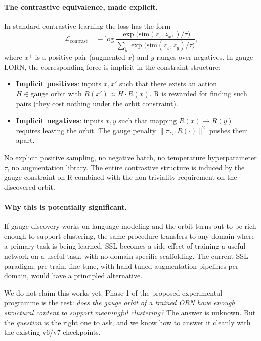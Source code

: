 \documentclass[11pt, a4paper]{article}
\theoremstyle{plain}
\theoremstyle{definition}
\theoremstyle{remark}
\begin{document}
\paragraph{The contrastive equivalence, made explicit.}
In standard contrastive learning the loss has the form
\[
\mathcal{L}_{\text{contrast}} = -\log \frac{\exp\!\big(\mathrm{sim}(z_x, z_{x^+})/\tau\big)}{\sum_{y} \exp\!\big(\mathrm{sim}(z_x, z_y)/\tau\big)},
\]
where $x^+$ is a positive pair (augmented $x$) and $y$ ranges over negatives.
In gauge-LORN, the corresponding force is implicit in the constraint structure:
\begin{itemize}[nosep]
\item \textbf{Implicit positives}: inputs $x, x'$ such that there exists an action $H \in \text{gauge orbit}$ with $R(x') \approx H \cdot R(x)$. R is rewarded for finding such pairs (they cost nothing under the orbit constraint).
\item \textbf{Implicit negatives}: inputs $x, y$ such that mapping $R(x) \to R(y)$ requires leaving the orbit. The gauge penalty $\| \pi_{G^{\perp}} R(\cdot) \|^2$ pushes them apart.
\end{itemize}
No explicit positive sampling, no negative batch, no temperature hyperparameter $\tau$, no augmentation library. The entire contrastive structure is induced by the gauge constraint on R combined with the non-triviality requirement on the discovered orbit.

\paragraph{Why this is potentially significant.}
If gauge discovery works on language modeling and the orbit turns out to be rich enough to support clustering, the same procedure transfers to any domain where a primary task is being learned. SSL becomes a side-effect of training a useful network on a useful task, with no domain-specific scaffolding. The current SSL paradigm, pre-train, fine-tune, with hand-tuned augmentation pipelines per domain, would have a principled alternative.

We do not claim this works yet. Phase 1 of the proposed experimental programme is the test: \emph{does the gauge orbit of a trained ORN have enough structural content to support meaningful clustering?} The answer is unknown. But the \emph{question} is the right one to ask, and we know how to answer it cleanly with the existing v6/v7 checkpoints.
\end{document}
